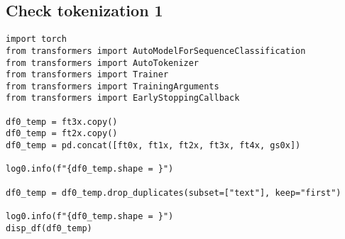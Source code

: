 \documentclass[a4paper,10pt,onecolumn,oneside,openright]{article}
\begin{document}
\subsection{Check tokenization 1}
\label{sec:org85f6462}
\begin{verbatim}
import torch
from transformers import AutoModelForSequenceClassification
from transformers import AutoTokenizer
from transformers import Trainer
from transformers import TrainingArguments
from transformers import EarlyStoppingCallback

df0_temp = ft3x.copy()
df0_temp = ft2x.copy()
df0_temp = pd.concat([ft0x, ft1x, ft2x, ft3x, ft4x, gs0x])

log0.info(f"{df0_temp.shape = }")

df0_temp = df0_temp.drop_duplicates(subset=["text"], keep="first")

log0.info(f"{df0_temp.shape = }")
disp_df(df0_temp)
\end{verbatim}
\end{document}
